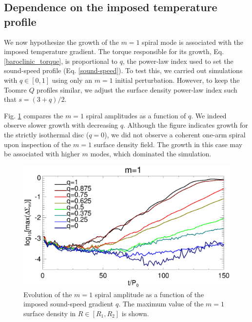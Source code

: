 
\subsection{Dependence on the imposed temperature profile} 
We now hypothesize the growth of the $m=1$ spiral mode is
associated with the imposed temperature gradient. The torque
responsible for its growth, Eq. \ref{baroclinic_torque}, is
proportional to $q$, the power-law index used to set the sound-speed
profile (Eq. \ref{sound-speed}). To test this, we carried out
simulations with $q\in[0,1]$ using only an $m=1$ initial 
perturbation. However, to keep the Toomre $Q$ profiles similar, we adjust
the surface density power-law index such that $s = (3+q)/2$. 

Fig. \ref{fargo_varq} compares the $m=1$ spiral amplitudes as a
function of $q$. We indeed observe slower growth with decreasing
$q$. Although the figure indicates growth for the strictly isothermal
disc ($q=0$), we did not observe a coherent one-arm spiral upon
inspection of the $m=1$ surface density field. The growth in this case
may be associated with higher $m$ modes, which dominated the
simulation.    

\begin{figure}
  \includegraphics[width=\linewidth]{figures/m1_analysis_plot_fargo_varq.ps}   
  \caption{Evolution of the $m=1$ spiral amplitude as a function of
    the imposed sound-speed gradient $q$. The maximum value of the
    $m=1$ surface density in $R\in[R_1,R_2]$ is shown. 
    \label{fargo_varq}} 
\end{figure}

